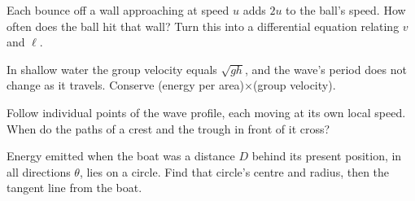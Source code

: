  Each bounce off a wall approaching at speed $u$ adds $2u$ to the ball's speed. How often does the ball hit that wall? Turn this into a differential equation relating $v$ and $\ell$.


 In shallow water the group velocity equals $\sqrt{gh}$, and the wave's period does not change as it travels. Conserve (energy per area)$\times$(group velocity).

 Follow individual points of the wave profile, each moving at its own local speed. When do the paths of a crest and the trough in front of it cross?

 Energy emitted when the boat was a distance $D$ behind its present position, in all directions $\theta$, lies on a circle. Find that circle's centre and radius, then the tangent line from the boat.
